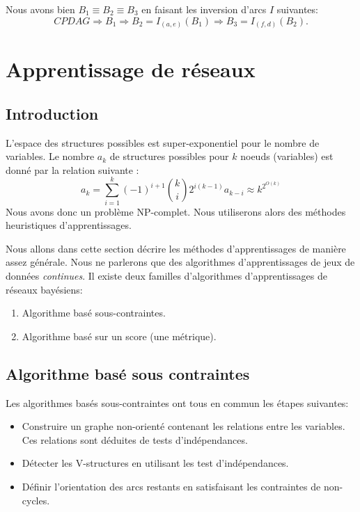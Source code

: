 \documentclass[a4paper]{article}
\begin{document}
Nous avons bien $B_1 \equiv B_2 \equiv B_3$ en faisant les inversion d'arcs $I$ suivantes:
$$CPDAG \Longrightarrow B_1 \Longrightarrow B_2=I_{(a,e)}(B_1) \Longrightarrow B_3=I_{(f,d)}(B_2).$$



\newpage

\section{Apprentissage de réseaux }

\subsection{Introduction}

L'espace des structures possibles est super-exponentiel pour le nombre de variables.
Le nombre $a_{k}$ de structures possibles pour $k$ noeuds (variables) est donné par la relation suivante :
$$a_{k}=\sum_{i=1}^{k}(-1)^{i+1} {k\choose i}2^{i(k-1)} a_{k-i}\approx k^{2^{O(k)}}$$
Nous avons donc un problème NP-complet.
Nous utiliserons alors des méthodes heuristiques d'apprentissages.

Nous allons dans cette section décrire les méthodes d'apprentissages de manière assez générale. 
Nous ne parlerons que des algorithmes d'apprentissages de jeux de données \emph{continues}.
Il existe deux familles d'algorithmes d'apprentissages de réseaux bayésiens:
\begin{enumerate}
  \item Algorithme basé sous-contraintes.
  \item Algorithme basé sur un score (une métrique).
\end{enumerate}

\subsection{Algorithme basé sous contraintes }

Les algorithmes basés sous-contraintes ont tous en commun les étapes suivantes:
\begin{itemize}
  \item Construire un graphe non-orienté  contenant les relations entre les variables. Ces relations sont déduites de tests d'indépendances.
  \item Détecter les V-structures en utilisant les test d'indépendances.
  \item Définir l'orientation des arcs restants en satisfaisant les contraintes de non-cycles.
\end{itemize}
\end{document}
